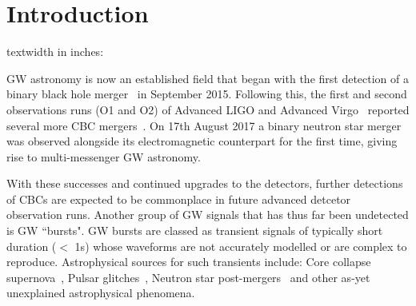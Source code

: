 \documentclass[12pt]{iopart}
\begin{document}
\section{Introduction}
textwidth in inches: \prntlen{\textwidth}

%
\Ac{GW} astronomy is now an established field that began with the first
detection of a binary black hole merger~\cite{Abbott2016} in September 2015.
Following this, the first and second observations runs (O1 and O2) of Advanced
LIGO and Advanced Virgo~\cite{Prospects-dets, AdvLIGO, AdvLIGO2, AdvVIRGO}
reported several more \ac{CBC} mergers~\cite{Abbott2016a, Abbott2017,
Abbott2017a, Abbott2017b}. On 17th August 2017 a binary neutron star merger was
observed alongside its electromagnetic counterpart for the first time, giving
rise to multi-messenger \ac{GW} astronomy. 

%
With these successes and continued upgrades to the detectors, further
detections of \acp{CBC} are expected to be commonplace in future advanced
detcetor observation runs. Another group of \ac{GW} signals that has thus far
been undetected is \ac{GW} ``bursts". \ac{GW} bursts are classed as transient
signals of typically short duration ($<$ 1s) whose waveforms are not accurately
modelled or are complex to reproduce. Astrophysical sources for such transients
include: Core collapse supernova~\cite{Fryer_2003}, Pulsar
glitches~\cite{Andersson_2001}, Neutron star post-mergers~\cite{Baiotti_2007}
and other as-yet unexplained astrophysical phenomena. 
\end{document}
